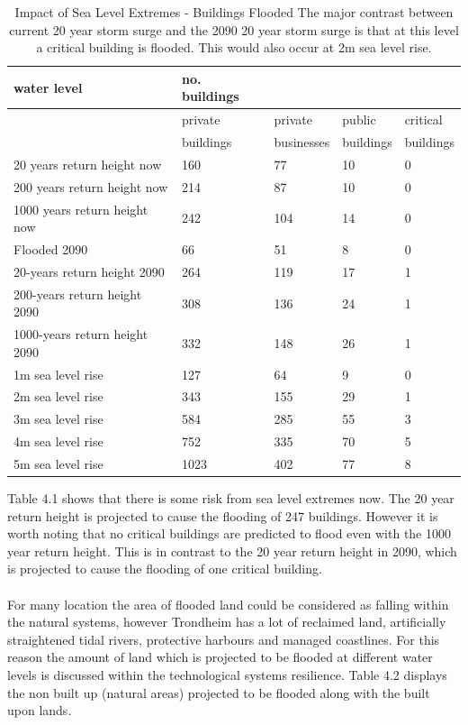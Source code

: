 \begin{table}[h]
    \centering
    \begin{tabular}{|l|l|l|l|l|}
    \hline
        water level & no. buildings  & ~ & ~ & ~ \\ \hline
        ~ & private & private & public  & critical  \\ \newline
        ~ & buildings & businesses & buildings & buildings \\ \hline        
        20 years return height now & 160 & 77 & 10 & 0 \\ \hline
        200 years return height now & 214 & 87 & 10 & 0 \\ \hline
        1000 years return height now & 242 & 104 & 14 & 0 \\ \hline
        Flooded 2090 & 66 & 51 & 8 & 0 \\ \hline
        20-years return height 2090 & 264 & 119 & 17 & 1 \\ \hline
        200-years return height  2090 & 308 & 136 & 24 & 1 \\ \hline
        1000-years return height  2090 & 332 & 148 & 26 & 1 \\ \hline
        1m sea level rise & 127 & 64 & 9 & 0 \\ \hline
        2m sea level rise & 343 & 155 & 29 & 1 \\ \hline
        3m sea level rise & 584 & 285 & 55 & 3 \\ \hline
        4m sea level rise & 752 & 335 & 70 & 5 \\ \hline
        5m sea level rise & 1023 & 402 & 77 & 8 \\ \hline
    \end{tabular}
    \caption{Impact of Sea Level Extremes - Buildings Flooded \cite{kartverket_se_2021} The major contrast between current 20 year storm surge and the 2090 20 year storm surge is that at this level a critical building is flooded. This would also occur at 2m sea level rise.}
    \label{building-impact-sle}
\end{table}
Table 4.1 shows that there is some risk from sea level extremes now. The 20 year return height is projected to cause the flooding of 247 buildings. However it is worth noting that no critical buildings are predicted to flood even with the 1000 year return height. This is in contrast to the 20 year return height in 2090, which is projected to cause the flooding of one critical building.

\paragraph{}
For many location the area of flooded land could be considered as falling within the natural systems, however Trondheim has a lot of reclaimed land, artificially straightened tidal rivers, protective harbours and managed coastlines. For this reason the amount of land which is projected to be flooded at different water levels is discussed within the technological systems resilience. Table 4.2 displays the non built up (natural areas) projected to be flooded along with the built upon lands.

